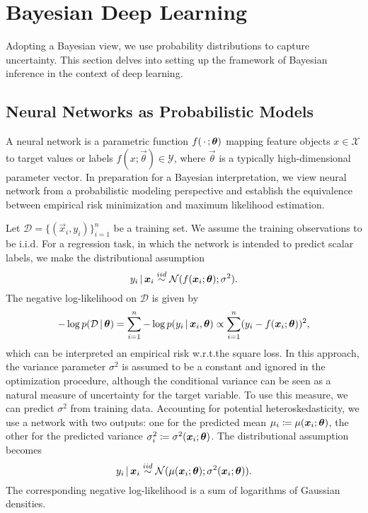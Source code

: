 \section{Bayesian Deep Learning}
\label{sec:bayesian-dl}

Adopting a Bayesian view, we use probability distributions to capture uncertainty. This section delves into setting up the framework of Bayesian inference in the context of deep learning.  

\subsection{Neural Networks as Probabilistic Models}
\label{sec:nn}

A neural network is a parametric function $f(\,\cdot\,; \bm{\theta})$ mapping feature objects $x \in \mathcal{X}$ to target values or labels $f(x; \vec{\theta}) \in \mathcal{Y}$, where $\vec{\theta}$ is a typically high-dimensional parameter vector. In preparation for a Bayesian interpretation, we view neural network from a probabilistic modeling perspective and establish the equivalence between empirical risk minimization and maximum likelihood estimation.

Let $\mathcal{D} = \{(\vec{x}_i, y_i)\}_{i=1}^{n}$ be a training set. We assume the training observations to be i.i.d. For a regression task, in which the network is intended to predict scalar labels, we make the distributional assumption
\begin{equation*}
  y_i \,|\, \bm{x}_i \overset{iid}{\sim} \mathcal{N}(f(\bm{x}_i; \bm{\theta}); \sigma^2).
\end{equation*}
The negative log-likelihood on $\mathcal{D}$ is given by
\begin{equation*}
  - \log p(\mathcal{D} \,|\, \bm{\theta}) = \sum_{i=1}^{n} - \log p(y_i \,|\, \bm{x}_i, \bm{\theta})
  \propto \sum_{i=1}^{n} (y_i - f(\bm{x}_i; \bm{\theta}))^2,
\end{equation*}
which can be interpreted an empirical risk w.r.t.\@ the square loss. In this approach, the variance parameter $\sigma^2$ is assumed to be a constant and ignored in the optimization procedure, although the conditional variance can be seen as a natural measure of uncertainty for the target variable. To use this measure, we can predict $\sigma^2$ from training data. Accounting for potential heteroskedasticity, we use a network with two outputs: one for the predicted mean $\mu_i \coloneqq \mu(\bm{x}_i; \bm{\theta})$, the other for the predicted variance $\sigma^2_i \coloneqq \sigma^2(\bm{x}_i; \bm{\theta})$. The distributional assumption becomes
\begin{equation*}
  y_i \,|\, \bm{x}_i \overset{iid}{\sim} \mathcal{N}(\mu(\bm{x}_i; \bm{\theta}); \sigma^2(\bm{x}_i; \bm{\theta})).
\end{equation*}
The corresponding negative log-likelihood is a sum of logarithms of Gaussian densities.

